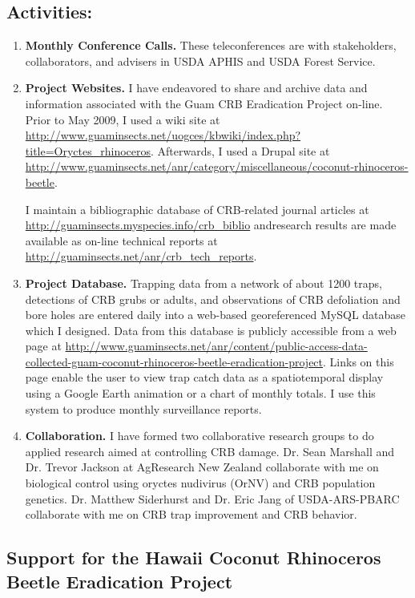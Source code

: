 \documentclass[12pt,oneside,english]{scrbook}
\begin{document}
\subsection{Activities:}
\begin{enumerate}

\item \textbf{Monthly Conference Calls.} These teleconferences are with stakeholders, collaborators,
and advisers in USDA APHIS and USDA Forest Service. 

\item \textbf{Project Websites. }I have endeavored to share and archive
data and information associated with the Guam CRB Eradication Project
on-line. Prior to May 2009, I used a wiki site at \url{http://www.guaminsects.net/uogces/kbwiki/index.php?title=Oryctes_rhinoceros}.
Afterwards, I used a Drupal site at \url{http://www.guaminsects.net/anr/category/miscellaneous/coconut-rhinoceros-beetle}.

I maintain a bibliographic database of CRB-related journal articles at \url{http://guaminsects.myspecies.info/crb_biblio} andresearch results are made available as on-line technical reports at \url{http://guaminsects.net/anr/crb_tech_reports}.

\item \textbf{Project Database. }Trapping data from a network of about 1200
traps, detections of CRB grubs or adults, and observations of CRB
defoliation and bore holes are entered daily into a web-based georeferenced
MySQL database which I designed. Data from this database is publicly
accessible from a web page at \url{http://www.guaminsects.net/anr/content/public-access-data-collected-guam-coconut-rhinoceros-beetle-eradication-project}.
Links on this page enable the user to view trap catch data as a spatiotemporal
display using a Google Earth animation or a chart of monthly totals.
I use this system to produce monthly surveillance reports. 

\item \textbf{Collaboration.} I have formed two collaborative research groups
to do applied research aimed at controlling CRB damage. Dr. Sean Marshall
and Dr. Trevor Jackson at AgResearch New Zealand collaborate with
me on biological control using oryctes nudivirus (OrNV) and CRB population
genetics. Dr. Matthew Siderhurst and Dr. Eric Jang of USDA-ARS-PBARC
collaborate with me on CRB trap improvement and CRB behavior. 
\end{enumerate}


\subsection{\label{sub:Hawaii CRB}Support for the Hawaii Coconut Rhinoceros Beetle Eradication Project}
\end{document}
